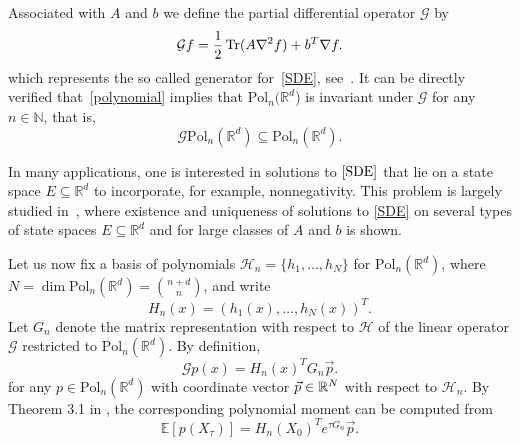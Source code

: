 Associated with $A$ and $b$ we define the partial differential operator $\mathcal{G}$ by 
\begin{equation}\label{generator}
\mathcal{G}f=\frac{1}{2}\operatorname{Tr}(A \nabla^2 f)+b^T \nabla f.
\end{equation}
which represents the so called generator
for~\eqref{SDE}, see~\cite{Oksendal2003}. It can be directly verified that~\eqref{polynomial} implies that $\text{Pol}_n(\mathbb{R}^d$) is invariant under $\mathcal{G}$  for any $n \in \mathbb{N}$, that is, 
\begin{equation}\label{PreservingProperty}
\mathcal{G}\text{Pol}_n(\mathbb{R}^d) \subseteq \text{Pol}_n(\mathbb{R}^d).
\end{equation}
\begin{remark}
    \begin{rm}
In many applications, one is interested in solutions to $\eqref{SDE}$ that lie on a state space $E \subseteq \mathbb{R}^d$ to incorporate, for example, nonnegativity. This problem is largely studied in~\cite{filipovic2016polynomial}, where existence and uniqueness of solutions to \eqref{SDE} on several types of state spaces $E \subseteq \mathbb{R}^d$ and for large classes of $A$ and $b$ is shown.
    \end{rm}
\end{remark}
Let us now fix a basis of polynomials $\mathcal{H}_n=\{h_1, \dots, h_N\}$ for $\text{Pol}_n(\mathbb{R}^d)$, where $N= \dim \text{Pol}_n(\mathbb{R}^d) = \binom{n+d}{n}$, and write
\begin{equation*}
H_n(x)=(h_1(x), \dots, h_N(x))^T.
\end{equation*}
Let $G_n$ denote the matrix representation with respect to $\mathcal{H}$ of the linear operator $\mathcal{G}$ restricted to $\text{Pol}_n(\mathbb{R}^d)$. By definition,
\begin{equation*}
\mathcal{G}p(x)=H_n(x)^T G_n \vec{p}.
\end{equation*}
for any $p\in \text{Pol}_n(\mathbb{R}^d)$ with coordinate vector $\vec{p} \in {\mathbb R}^N$ with respect to $\mathcal{H}_n$.
By Theorem 3.1 in \cite{filipovic2016polynomial}, the  corresponding polynomial moment can be computed from
\begin{equation}\label{condmoments}
\mathbb{E}[p(X_\tau)]=H_n(X_0)^Te^{\tau G_n} \vec{p}.
\end{equation}


